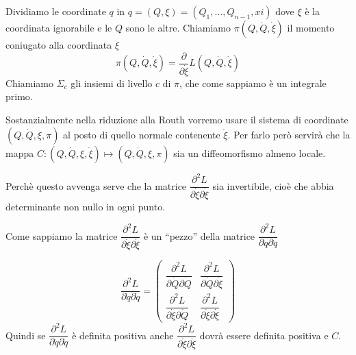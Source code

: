 \documentclass[11pt,a4paper,twoside]{book}
\theoremstyle{esss}
\theoremstyle{dotless}
\numberwithin{equation}{section} %
\begin{document}
Dividiamo le coordinate $q$ in $q=(Q,\xi)=(Q_1,\dots,Q_{n-1},xi)$ dove $\xi$ è la coordinata ignorabile e le $Q$ sono le altre.
Chiamiamo $\pi(Q,\dot{Q},\dot{\xi})$ il momento coniugato alla coordinata $\xi$ 
\begin{equation}
\pi(Q,\dot{Q},\dot{\xi})=\dfrac{\partial}{\partial \dot{\xi}} L(Q,\dot{Q},\dot{\xi})
\end{equation}
Chiamiamo $\Sigma_c$ gli insiemi di livello $c$ di $\pi$, che come sappiamo è un integrale primo.

Sostanzialmente nella riduzione alla Routh vorremo usare il sistema di coordinate $(Q,\dot{Q},\xi,\pi)$ al posto di quello normale contenente $\dot{\xi}$. Per farlo però servirà che la mappa $C:(Q,\dot{Q},\xi,\dot{\xi})\mapsto(Q,\dot{Q},\xi,\pi)$ sia un diffeomorfismo almeno locale. 

Perchè questo avvenga serve che la matrice $\dfrac{\partial^2 L}{\partial \dot{\xi}\partial\dot{\xi}}$ sia invertibile, cioè che abbia determinante non nullo in ogni punto.

Come sappiamo la matrice $\dfrac{\partial^2 L}{\partial \dot{\xi}\partial\dot{\xi}}$ è un ``pezzo'' della matrice $\dfrac{\partial^2 L}{\partial \dot{q}\partial\dot{q}}$

\[
\dfrac{\partial^2 L}{\partial \dot{q}\partial\dot{q}}=
\left(\begin{array}{c|c} 
\dfrac{\partial^2 L}{\partial \dot{Q}\partial\dot{Q}} & 
\dfrac{\partial^2 L}{\partial \dot{Q}\partial\dot{\xi}} \\ \hline
\dfrac{\partial^2 L}{\partial \dot{\xi}\partial\dot{Q}} & \dfrac{\partial^2 L}{\partial \dot{\xi}\partial\dot{\xi}}
\end{array}\right)
\]
 Quindi se $\dfrac{\partial^2 L}{\partial \dot{q}\partial\dot{q}}$ è definita positiva anche $\dfrac{\partial^2 L}{\partial \dot{\xi}\partial\dot{\xi}}$ dovrà essere definita positiva e $C$.
\end{document}
